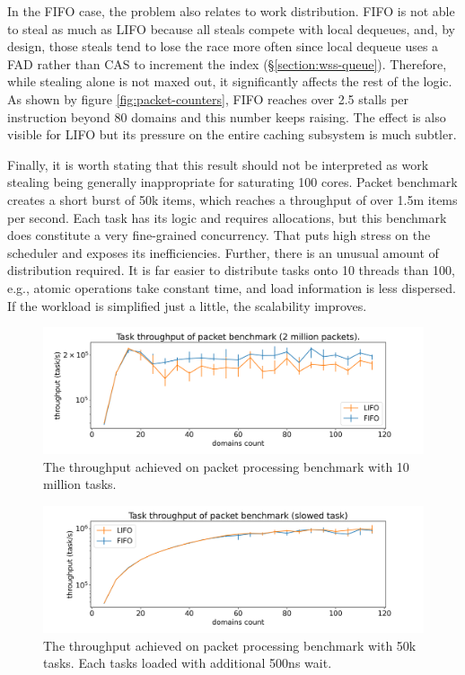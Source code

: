 \documentclass[12pt,a4paper,twoside]{report}
\begin{document}
In the FIFO case, the problem also relates to work distribution. FIFO is not able to steal as much as LIFO because all steals compete with local dequeues, and, by design, those steals tend to lose the race more often since local dequeue uses a FAD rather than CAS to increment the index (\S\ref{section:wss-queue}). Therefore, while stealing alone is not maxed out, it significantly affects the rest of the logic. As shown by figure \ref{fig:packet-counters}, FIFO reaches over 2.5 stalls per instruction beyond 80 domains and this number keeps raising. The effect is also visible for LIFO but its pressure on the entire caching subsystem is much subtler.

Finally, it is worth stating that this result should not be interpreted as work stealing being generally inappropriate for saturating 100 cores. Packet benchmark creates a short burst of 50k items, which reaches a throughput of over 1.5m items per second. Each task has its logic and requires allocations, but this benchmark does constitute a very fine-grained concurrency. That puts high stress on the scheduler and exposes its inefficiencies. Further, there is an unusual amount of distribution required. It is far easier to distribute tasks onto 10 threads than 100, e.g., atomic operations take constant time, and load information is less dispersed. If the workload is simplified just a little, the scalability improves. 
\begin{figure} 
     \centering
     \includegraphics[width=1\textwidth]{eval/packet-basic-10million-just-throughput-bigger_font.png}
     \caption{The throughput achieved on packet processing benchmark with 10 million tasks.}
    \label{fig:packet-10m-throughput}
\end{figure}


\begin{figure} 
     \centering
     \includegraphics[width=1\textwidth]{eval/packet-basic-slowed_2-bigger_font.png}
     \caption{The throughput achieved on packet processing benchmark with 50k tasks. Each tasks loaded with additional 500ns wait.}
    \label{fig:packet-slowed}
\end{figure}
\end{document}
